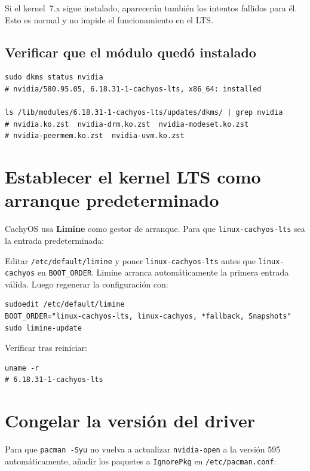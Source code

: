 \documentclass[12pt,a4paper]{article}
\begin{document}
Si el kernel~7.x sigue instalado, aparecerán también los intentos fallidos
para él. Esto es normal y no impide el funcionamiento en el LTS.

\subsection{Verificar que el módulo quedó instalado}

\begin{lstlisting}[style=bash]
sudo dkms status nvidia
# nvidia/580.95.05, 6.18.31-1-cachyos-lts, x86_64: installed

ls /lib/modules/6.18.31-1-cachyos-lts/updates/dkms/ | grep nvidia
# nvidia.ko.zst  nvidia-drm.ko.zst  nvidia-modeset.ko.zst
# nvidia-peermem.ko.zst  nvidia-uvm.ko.zst
\end{lstlisting}

\section{Establecer el kernel LTS como arranque predeterminado}

CachyOS usa \textbf{Limine} como gestor de arranque. Para que
\texttt{linux-cachyos-lts} sea la entrada predeterminada:

Editar \texttt{/etc/default/limine} y poner \texttt{linux-cachyos-lts} antes que
\texttt{linux-cachyos} en \texttt{BOOT\_ORDER}. Limine arranca automáticamente
la primera entrada válida. Luego regenerar la configuración con:

\begin{lstlisting}[style=bash]
sudoedit /etc/default/limine
BOOT_ORDER="linux-cachyos-lts, linux-cachyos, *fallback, Snapshots"
sudo limine-update
\end{lstlisting}

Verificar tras reiniciar:

\begin{lstlisting}[style=bash]
uname -r
# 6.18.31-1-cachyos-lts
\end{lstlisting}

\section{Congelar la versión del driver}

Para que \texttt{pacman -Syu} no vuelva a actualizar \texttt{nvidia-open}
a la versión 595 automáticamente, añadir los paquetes a \texttt{IgnorePkg}
en \texttt{/etc/pacman.conf}:
\end{document}
